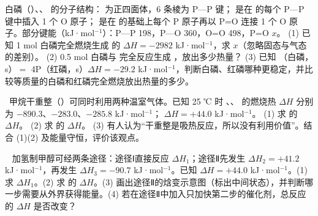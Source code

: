 \begin{xiti}
\item 白磷（）、、 的分子结构： 为正四面体，6 条棱为 P—P 键； 是在  的每个 P—P 键中插入 1 个 O 原子； 是在  的基础上每个 P 原子再以 P=O 连接 1 个 O 原子。部分键能（kJ·mol$^{-1}$）：P—P 198，P—O 360，O=O 498，P=O $x$。
(1) 已知 1 mol 白磷完全燃烧生成  的 $\Delta H=-2982$ kJ·mol$^{-1}$，求 $x$（忽略固态与气态的差别）。
(2) 0.5 mol 白磷与  完全反应生成 ，放出多少热量？
(3) 已知 （白磷，s）$=$ 4P（红磷，s）$\Delta H=-29.2$ kJ·mol$^{-1}$，判断白磷、红磷哪种更稳定，并比较等质量的白磷和红磷完全燃烧放出热量的多少。

\item {}\ 甲烷干重整（）可同时利用两种温室气体。已知 25 ℃ 时 、、 的燃烧热 $\Delta H$ 分别为 $-890.3$、$-283.0$、$-285.8$ kJ·mol$^{-1}$； $\Delta H=+44.0$ kJ·mol$^{-1}$。
(1) 求  的 $\Delta H$。
(2) 求  的 $\Delta H$。
(3) 有人认为“干重整是吸热反应，所以没有利用价值”。结合 (1)(2) 及能量守恒，评价该观点。

\item {}\  加氢制甲醇可经两条途径：途径Ⅰ直接反应  $\Delta H_1$；途径Ⅱ先发生  $\Delta H_2=+41.2$ kJ·mol$^{-1}$，再发生  $\Delta H_3=-90.7$ kJ·mol$^{-1}$。已知  $\Delta H=+44.0$ kJ·mol$^{-1}$。(1) 求 $\Delta H_1$。(2) 求  的 $\Delta H$。(3) 画出途径Ⅱ的焓变示意图（标出中间状态），并判断哪一步需要从外界获得能量。(4) 若在途径Ⅱ中加入只加快第二步的催化剂，总反应的 $\Delta H$ 是否改变？
\end{xiti}

